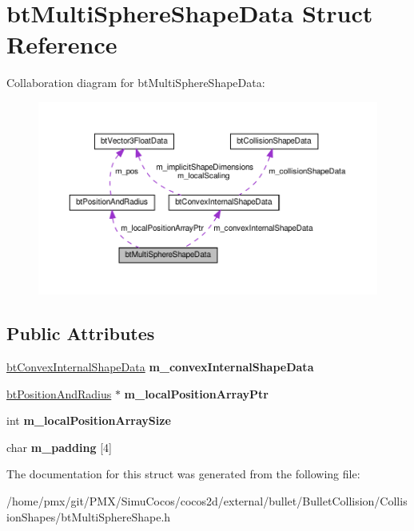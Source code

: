 \hypertarget{structbtMultiSphereShapeData}{}\section{bt\+Multi\+Sphere\+Shape\+Data Struct Reference}
\label{structbtMultiSphereShapeData}


Collaboration diagram for bt\+Multi\+Sphere\+Shape\+Data\+:
\nopagebreak
\begin{figure}[H]
\begin{center}
\leavevmode
\includegraphics[width=350pt]{structbtMultiSphereShapeData__coll__graph}
\end{center}
\end{figure}
\subsection*{Public Attributes}
\begin{DoxyCompactItemize}
\item 
\mbox{\label{structbtMultiSphereShapeData_a0ab02433fb0a1450a8989c87413455d0}} 
\hyperlink{structbtConvexInternalShapeData}{bt\+Convex\+Internal\+Shape\+Data} {\bfseries m\+\_\+convex\+Internal\+Shape\+Data}
\item 
\mbox{\label{structbtMultiSphereShapeData_ab21239c4cae4664b887164d1927cc058}} 
\hyperlink{structbtPositionAndRadius}{bt\+Position\+And\+Radius} $\ast$ {\bfseries m\+\_\+local\+Position\+Array\+Ptr}
\item 
\mbox{\label{structbtMultiSphereShapeData_a244c43eefa09a1eb143422578410c3f3}} 
int {\bfseries m\+\_\+local\+Position\+Array\+Size}
\item 
\mbox{\label{structbtMultiSphereShapeData_a7f59d2b14a99606f71f1bd10af4f04ac}} 
char {\bfseries m\+\_\+padding} \mbox{[}4\mbox{]}
\end{DoxyCompactItemize}


The documentation for this struct was generated from the following file\+:\begin{DoxyCompactItemize}
\item 
/home/pmx/git/\+P\+M\+X/\+Simu\+Cocos/cocos2d/external/bullet/\+Bullet\+Collision/\+Collision\+Shapes/bt\+Multi\+Sphere\+Shape.\+h\end{DoxyCompactItemize}
